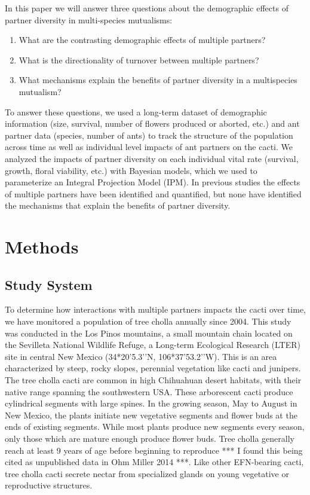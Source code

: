 \documentclass[12pt,a4paper]{article}
\begin{document}
In this paper we will answer three questions about the demographic effects of partner diversity in multi-species mutualisms:
\begin{enumerate}
	\item{What are the contrasting demographic effects of multiple partners?}
	\item{What is the directionality of turnover between multiple partners?}
	\item{What mechanisms explain the benefits of partner diversity in a multispecies mutualism?}
\end{enumerate}


To answer these questions, we used a long-term dataset of demographic information (size, survival, number of flowers produced or aborted, etc.) and ant partner data (species, number of ants) to track the structure of the population across time as well as individual level impacts of ant partners on the cacti. 
We analyzed the impacts of partner diversity on each individual vital rate (survival, growth, floral viability, etc.) with Bayesian models, which we used to parameterize an Integral Projection Model (IPM).
In previous studies the effects of multiple partners have been identified and quantified\cite{Palmer2010}, but none have identified the mechanisms that explain the benefits of partner diversity. 


\section*{Methods}
\subsection*{Study System}

To determine how interactions with multiple partners impacts the cacti over time, we have monitored a population of tree cholla annually since 2004. 
This study was conducted in the Los Pinos mountains, a small mountain chain located on the Sevilleta National Wildlife Refuge, a Long-term Ecological Research (LTER) site in central New Mexico (34*20’5.3’’N, 106*37’53.2’’W).
This is an area characterized by steep, rocky slopes, perennial vegetation like cacti and junipers. 
The tree cholla cacti are common in high Chihuahuan desert habitats, with their native range spanning the southwestern USA\cite{Benson1982}. 
These arborescent cacti produce cylindrical segments with large spines. 
In the growing season, May to August in New Mexico, the plants initiate new vegetative segments and flower buds at the ends of existing segments. 
While most plants produce new segments every season, only those which are mature enough produce flower buds. 
Tree cholla generally reach at least 9 years of age before beginning to reproduce *** I found this being cited as unpublished data in Ohm Miller 2014 ***. 
Like other EFN-bearing cacti, tree cholla cacti secrete nectar from specialized glands on young vegetative or reproductive structures\cite{Ness2006,Oliveira1999}.
\end{document}
